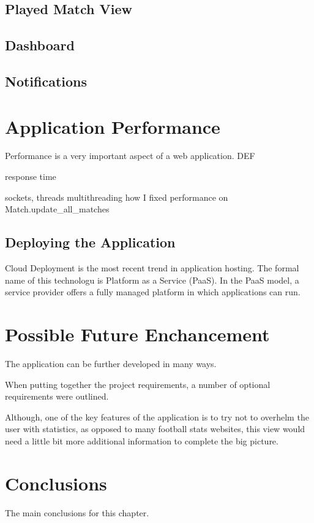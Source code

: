 \subsection{Played Match View}
\label{subsec:playedmatchview}

\subsection{Dashboard}
\label{subsec:dashboard}


\subsection{Notifications}
\label{subsec:notifications}


\section{Application Performance}
\label{sec:applicationperformance}
Performance is a very important aspect of a web application. DEF 

response time 

sockets, threads
multithreading
how I fixed performance on Match.update\_all\_matches

\subsection{Deploying the Application}
Cloud Deployment is the most recent trend in application hosting. The formal name of this technologu is Platform as a Service (PaaS).  In the PaaS model, a service provider offers a fully managed platform in which applications can run.

\section{Possible Future Enchancement}
\label{sec:enchancement}
The application can be further developed in many ways.  

When putting together the project requirements, a number of optional requirements were outlined. 

Although, one of the key features of the application is to try not to overhelm the user with statistics, as opposed to many football stats websites, this view would need a little bit more additional information to complete the big picture.

\section{Conclusions}
The main conclusions for this chapter.